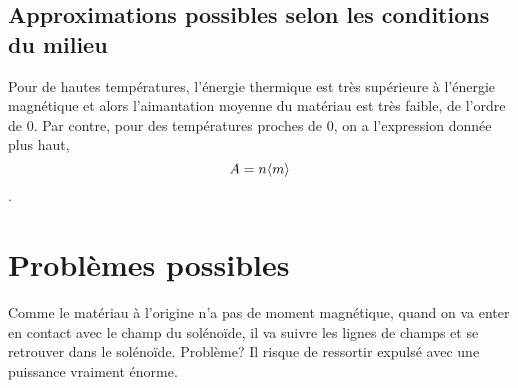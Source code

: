 \documentclass{article}
\begin{document}
\subsection{Approximations possibles selon les conditions du milieu}
Pour de hautes températures, l'énergie thermique est très supérieure à l'énergie magnétique et alors l'aimantation moyenne du matériau est très faible, de l'ordre de 0. Par contre, pour des températures proches de 0, on a l'expression donnée plus haut, $$A = n \valmoy{m}$$.

\section{Problèmes possibles}
Comme le matériau à l'origine n'a pas de moment magnétique, quand on va enter en contact avec le champ du solénoïde, il va suivre les lignes de champs et se retrouver dans le solénoïde. Problème? Il risque de ressortir expulsé avec une puissance vraiment énorme.
\end{document}
